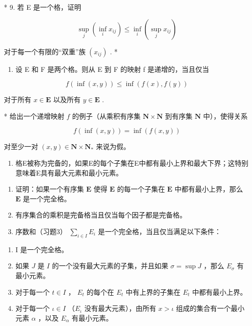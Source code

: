 * 9. 若 E 是一个格，证明

\[
\sup _ {j} \left(\inf _ {i} x _ {i j}\right) \leqslant \inf _ {i} \left(\sup _ {j} x _ {i j}\right)
\]

对于每一个有限的“双重”族 \((x_{ij})\) . *

\begin{enumerate}
\def\labelenumi{\arabic{enumi}.}
\setcounter{enumi}{9}
\tightlist
\item
  设 E 和 F 是两个格。则从 E 到 F 的映射 f 是递增的，当且仅当
\end{enumerate}

\[
f (\inf (x, y)) \leqslant \inf (f (x), f (y))
\]

对于所有 \(x \in \mathbf{E}\) 以及所有 \(y \in \mathbf{E}\) .

* 给出一个递增映射 \(f\) 的例子（从乘积有序集 \(\mathbf{N} \times \mathbf{N}\) 到有序集 \(\mathbf{N}\) 中），使得关系

\[
f (\inf (x, y)) = \inf (f (x, y))
\]

对至少一对 \((x, y) \in \mathbf{N} \times \mathbf{N}_{*}\) 来说为假。

\begin{enumerate}
\def\labelenumi{\arabic{enumi}.}
\setcounter{enumi}{10}
\tightlist
\item
  格E被称为完备的，如果E的每个子集在E中都有最小上界和最大下界；这特别意味着E具有最大元素和最小元素。
\end{enumerate}

\begin{enumerate}
\def\labelenumi{(\alph{enumi})}
\item
  证明：如果一个有序集 \(\mathbf{E}\) 使得 \(\mathbf{E}\) 的每一个子集在 \(\mathbf{E}\) 中都有最小上界，那么 \(\mathbf{E}\) 是一个完全格。
\item
  有序集合的乘积是完备格当且仅当每个因子都是完备格。
\item
  序数和（习题3） \(\sum_{i\in I}E_i\) 是一个完全格，当且仅当满足以下条件：
\end{enumerate}

\begin{enumerate}
\def\labelenumi{(\Roman{enumi})}
\item
  I 是一个完全格。
\item
  如果 \(J\) 是 \(I\) 的一个没有最大元素的子集，并且如果 \(\sigma = \sup J\) ，那么 \(E_{\sigma}\) 有最小元素。
\item
  对于每一个 \(t \in I\) ， \(E_t\) 的每个在 \(E_t\) 中有上界的子集在 \(E_t\) 中都有最小上界。
\item
  对于每一个 \(\iota\in I\) （\(E_{\iota}\) 没有最大元素），由所有 \(x>\iota\) 组成的集合有一个最小元素 \(\alpha\) ，以及 \(E_{\alpha}\) 有最小元素。
\end{enumerate}

